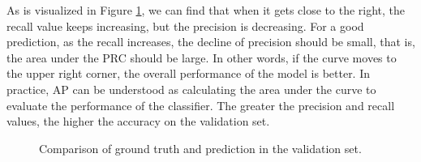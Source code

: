 \documentclass[sensors,article,submit,moreauthors,pdftex]{Definitions/mdpi}
\begin{document}
\begin{paracol}{2}
As is visualized in Figure \ref{fig:prc}, we can find that when it gets close to the right, the recall value keeps increasing, but the precision is decreasing. For a good prediction, as the recall increases, the decline of precision should be small, that is, the area under the PRC should be large. In other words, if the curve moves to the upper right corner, the overall performance of the model is better. In practice, AP can be understood as calculating the area under the curve to evaluate the performance of the classifier. The greater the precision and recall values, the higher the accuracy on the validation set.

\begin{figure}[H]
\centering
{}
\quad
{}
\caption{Comparison of ground truth and prediction in the validation set.}
\label{fig:prc}
\end{figure}


\end{paracol}
\end{document}
